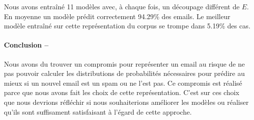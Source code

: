 \documentclass[a4paper, french]{article}
\begin{document}
Nous avons entra\^in\'e 11 mod\`eles avec, \`a chaque fois, un d\'ecoupage
diff\'erent de $E$. En moyenne un mod\`ele pr\'edit correctement 94.29\%
des emails. Le meilleur mod\`ele entra\^in\'e sur cette repr\'esentation
du corpus se trompe dans 5.19\% des cas.

\paragraph{Conclusion --}
Nous avons du trouver un compromis pour repr\'esenter un email au risque de ne
pas pouvoir calculer les distributions de probabilit\'es n\'ecessaires pour
pr\'edire au mieux si un nouvel email est un spam ou ne l'est pas. Ce compromis
est r\'ealis\'e parce que nous avons fait les choix de cette repr\'esentation.
C'est sur ces choix que nous devrions r\'efl\'echir si nous souhaiterions
am\'eliorer les mod\`eles ou r\'ealiser qu'ils sont suffisament satisfaisant
\`a l'\'egard de cette approche.


\end{document}
